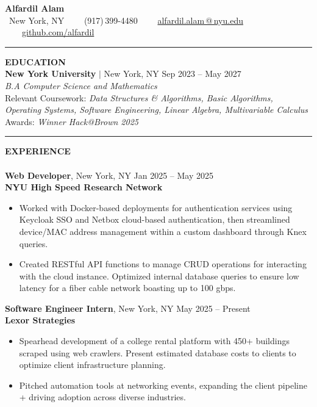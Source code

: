 \documentclass[11pt]{article}
\makeatletter
\newcommand{\name}{Alfardil Alam}
\newcommand{\addressCity}{New York, NY}
\newcommand{\phone}{(917)\,399-4480}
\newcommand{\email}{\href{mailto:aa11101@nyu.edu}{alfardil.alam\,@\,nyu.edu}}
\newcommand{\github}{\href{https://github.com/alfardil}{github.com/alfardil}}
\newcommand{\web}{\href{https://alfardil.com}{alfardil.com}}
\newcommand{\majors}{B.A Computer Science and Mathematics}
\newcommand{\coursework}{\scriptsize{Data Structures \& Algorithms, Basic Algorithms, Operating Systems, Software Engineering, Linear Algebra, Multivariable Calculus}}
\newcommand{\awards}{\scriptsize{Winner Hack@Brown 2025}}
\newcommand{\resumeSection}[1]{%
  \rule{0.04\textwidth}{0.4pt}%
  \textbf{\Large \uppercase{#1}}%
  \hrulefill\\[0.2em]
}
\newenvironment{resumeItemize}{%
  \setlist{nolistsep}
  \begin{itemize}[leftmargin=*, label=\textbullet, itemsep=0.3em]
}{%
  \end{itemize}
}
\newcommand{\resumeSubItem}[1]{\item \small #1}
\makeatother
\begin{document}
{\Huge \textbf{\name}} \\ [0.3em]
\faMapMarker \ \addressCity
\ \ \ \faMobile \ \phone
\ \ \ \faEnvelopeO \ \email
\ \ \ \faGithub \ \github

\bigskip

\resumeSection{Education}
\textbf{\Large New York University} $|$ New York, NY \hfill Sep 2023 -- May 2027 \\
\textit{\majors}  \\ [0.2em]
\scriptsize{Relevant Coursework:} \textit{\coursework} \\
\scriptsize{Awards: }\textit{\awards}


\bigskip

\resumeSection{Experience}
\\[-0.7em]
\textbf{\large Web Developer}, New York, NY \hfill Jan 2025 -- May 2025 \\ [0.25em]
\textbf{NYU High Speed Research Network}
\begin{resumeItemize}
  \resumeSubItem{Worked with Docker-based deployments for authentication services using Keycloak SSO and
    Netbox cloud-based authentication, then streamlined device/MAC address management within a custom dashboard
    through Knex queries.}
  \resumeSubItem{Created RESTful API functions to manage CRUD operations for interacting with
    the cloud instance. Optimized internal database queries to ensure low latency for a fiber cable network boasting up to 100 gbps.}
\end{resumeItemize}

\medskip

\textbf{\large Software Engineer Intern}, New York, NY \hfill May 2025 -- Present \\ [0.25em]
\textbf{Lexor Strategies}
\begin{resumeItemize}
  \resumeSubItem{Spearhead development of a college rental platform with 450+ buildings scraped using web crawlers.
    Present estimated database costs to clients to optimize client infrastructure planning.}
  \resumeSubItem{Pitched automation tools at networking events, expanding the client pipeline + driving adoption
    across diverse industries.}
\end{resumeItemize}
\end{document}
